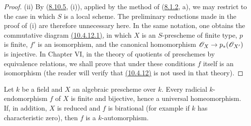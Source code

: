 \begin{proof}
\textup{(ii)} By ({\hyperref[IV.8.10.5]{8.10.5}}, (i)), applied by the method of ({\hyperref[IV.8.1.2]{8.1.2}}, a), we
may restrict to the case in which $S$ is a local scheme.  The preliminary
reductions made in the proof of (i) are therefore unnecessary here.  In
the same notation, one obtains the commutative diagram {\hyperref[IV.10.4.12.1]{(10.4.12.1)}}, in
which $X$ is an $S$-prescheme of finite type, $p$ is finite, $f'$ is an
isomorphism, and the canonical homomorphism
$\mathscr{O}_X\to p_*(\mathscr{O}_{X'})$ is injective.  In Chapter VI, in the
theory of quotients of preschemes by equivalence relations, we shall
prove that under these conditions $f$ itself is an isomorphism (the
reader will verify that {\hyperref[IV.10.4.12]{(10.4.12)}} is not used in that theory).
\end{proof}

\begin{corollary}[10.4.13]
\label{IV.10.4.13}
Let $k$ be a field and $X$ an algebraic prescheme over $k$.  Every
radicial $k$-endomorphism $f$ of $X$ is finite and bijective, hence a
universal homeomorphism.  If, in addition, $X$ is reduced and $f$ is
birational (for example if $k$ has characteristic zero), then $f$ is a
$k$-automorphism.
\end{corollary}

